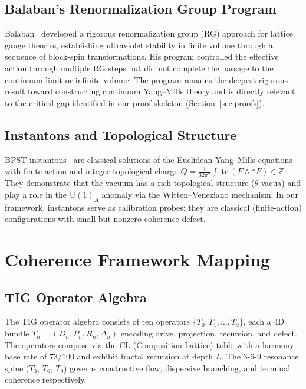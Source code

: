 \documentclass[11pt]{article}
\DeclareMathOperator{\tr}{tr}
\begin{document}
\subsection{Balaban's Renormalization Group Program}

Balaban~\cite{Balaban} developed a rigorous renormalization group (RG)
approach for lattice gauge theories, establishing ultraviolet stability
in finite volume through a sequence of block-spin transformations.
His program controlled the effective action through multiple RG steps
but did not complete the passage to the continuum limit or infinite
volume.  The program remains the deepest rigorous result toward
constructing continuum Yang--Mills theory and is directly relevant
to the critical gap identified in our proof skeleton (Section~\ref{sec:proofs}).

\subsection{Instantons and Topological Structure}

BPST instantons~\cite{BPST} are classical solutions of the Euclidean
Yang--Mills equations with finite action and integer topological charge
$Q = \frac{1}{32\pi^2}\int \tr(F \wedge {*F}) \in \mathbb{Z}$.
They demonstrate that the vacuum has a rich topological structure
($\theta$-vacua) and play a role in the $\mathrm{U}(1)_A$ anomaly via
the Witten--Veneziano mechanism.  In our framework, instantons serve as
calibration probes: they are classical (finite-action) configurations
with small but nonzero coherence defect.

\section{Coherence Framework Mapping}
\label{sec:framework}

\subsection{TIG Operator Algebra}

The TIG operator algebra consists of ten operators
$\{T_0, T_1, \ldots, T_9\}$, each a 4D bundle
$T_n = (D_n, P_n, R_n, \Delta_n)$ encoding drive, projection,
recursion, and defect.  The operators compose via the CL
(Composition-Lattice) table with a harmony base rate of $73/100$
and exhibit fractal recursion at depth $L$.  The 3-6-9 resonance
spine ($T_3$, $T_6$, $T_9$) governs constructive flow, dispersive
branching, and terminal coherence respectively.
\end{document}
